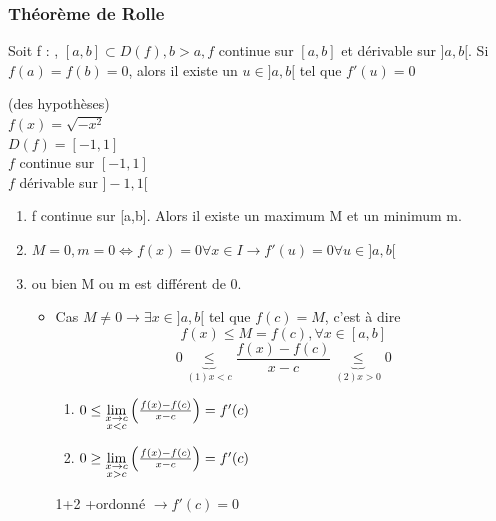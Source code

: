 \documentclass[12pt,a4paper]{article}
\begin{document}
{\subsubsection{Théorème de Rolle}
\begin{boite}
	\Theoreme Soit f : \rtor, $[a,b] \subset D(f), b > a, f$ continue sur $[a,b]$ et dérivable sur $]a,b[$. Si $f(a) = f(b) = 0$, alors il existe un $u \in ]a,b[$ tel que $f'(u) = 0$
\end{boite}
 (des hypothèses)\\
$f(x) = \sqrt{-x^2}$\\
$D(f) = [-1,1]$\\
$f$ continue sur $[-1,1]$\\
$f$ dérivable sur $]-1,1[$\\
\begin{enumerate}[label=\roman*]
	\item f continue sur [a,b]. Alors il existe un maximum M et un minimum m.
	\item $M = 0, m = 0 \iff f(x)= 0\forall x \in I \to f'(u) = 0 \forall u \in ]a,b[$
	\item ou bien M ou m est différent de 0.
		\begin{itemize}
			\item Cas $M \neq 0 \to \exists x \in ]a,b[$ tel que $f(c) = M$, c'est à dire
				\begin{equation}
					f(x) \leq M = f(c), \forall x \in [a,b]
				\end{equation}
				\begin{equation}
					0 \underbrace{\leq}_{(1) x < c} \frac{f(x) - f(c)}{x-c} \underbrace{\leq}_{(2) x > 0} 0 	
				\end{equation}
				\begin{enumerate}[label=\arabic*.]
					\item $0 \leq \lim\limits_{\substack{x \to c \\ x < c}}\left(\frac{f(x)-f(c)}{x-c}\right) = f'(c)$
					\item $0 \geq \lim\limits_{\substack{x \to c \\ x > c}}\left(\frac{f(x)-f(c)}{x-c}\right) = f'(c)$
				\end{enumerate}
				1+2 +\R ordonné $\to f'(c) = 0$
		\end{itemize}
\end{enumerate}
}
\end{document}
